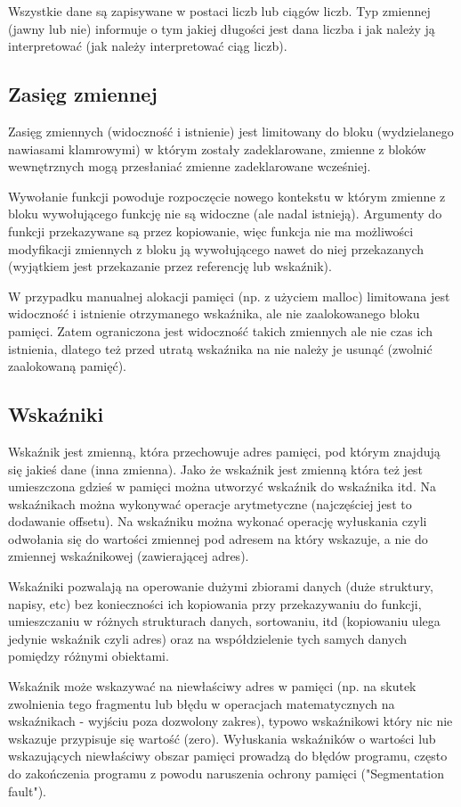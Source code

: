 Wszystkie dane są zapisywane w postaci liczb lub ciągów liczb. Typ zmiennej (jawny lub nie) informuje o tym jakiej długości jest dana liczba i jak należy ją interpretować (jak należy interpretować ciąg liczb).

\subsection{Zasięg zmiennej}
Zasięg zmiennych (widoczność i istnienie) jest limitowany do bloku (wydzielanego nawiasami klamrowymi) w którym zostały zadeklarowane, zmienne z bloków wewnętrznych mogą przesłaniać zmienne zadeklarowane wcześniej.

Wywołanie funkcji powoduje rozpoczęcie nowego kontekstu w którym zmienne
z bloku wywołującego funkcję nie są widoczne (ale nadal istnieją).
Argumenty do funkcji przekazywane są przez kopiowanie, więc funkcja nie ma
możliwości modyfikacji zmiennych z bloku ją wywołującego nawet do niej
przekazanych (wyjątkiem jest przekazanie przez referencję lub wskaźnik).

W przypadku manualnej alokacji pamięci (np. z użyciem malloc) limitowana jest widoczność i istnienie otrzymanego wskaźnika, ale nie zaalokowanego bloku pamięci. Zatem ograniczona jest widoczność takich zmiennych ale nie czas ich istnienia, dlatego też przed utratą wskaźnika na nie należy je usunąć (zwolnić zaalokowaną pamięć).

\subsection{Wskaźniki}
Wskaźnik jest zmienną, która przechowuje adres pamięci, pod którym znajdują się jakieś dane (inna zmienna). Jako że wskaźnik jest zmienną która też jest umieszczona gdzieś w pamięci można utworzyć wskaźnik do wskaźnika itd.
Na wskaźnikach można wykonywać operacje arytmetyczne (najczęściej jest to dodawanie offsetu). Na wskaźniku można wykonać operację wyłuskania czyli odwołania się do wartości zmiennej pod adresem na który wskazuje, a nie do zmiennej wskaźnikowej (zawierającej adres).

Wskaźniki pozwalają na operowanie dużymi zbiorami danych (duże struktury, napisy, etc) bez konieczności ich kopiowania przy przekazywaniu do funkcji, umieszczaniu w różnych strukturach danych, sortowaniu, itd (kopiowaniu ulega jedynie wskaźnik czyli adres) oraz na współdzielenie tych samych danych pomiędzy różnymi obiektami.

Wskaźnik może wskazywać na niewłaściwy adres w pamięci (np. na skutek zwolnienia tego fragmentu lub błędu w operacjach matematycznych na wskaźnikach - wyjściu poza dozwolony zakres), typowo wskaźnikowi który nic nie wskazuje przypisuje się wartość  (zero).
Wyłuskania wskaźników o wartości  lub wskazujących niewłaściwy obszar pamięci prowadzą do błędów programu, często do zakończenia programu z powodu naruszenia ochrony pamięci ("Segmentation fault").

